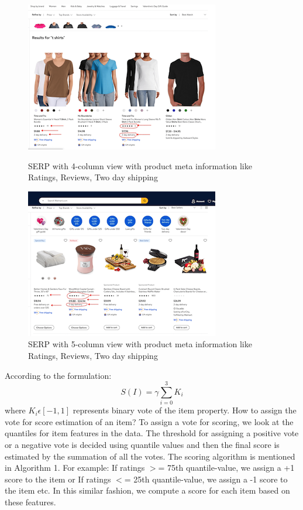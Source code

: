 \documentclass[11pt]{article}
\begin{document}
\begin{figure}[t!]
\vspace{-38mm}
   \centering
   \includegraphics[bb = 0 0 240 185]{figs/4-col-min.png}
   \caption{SERP with 4-column view with product meta information like Ratings, Reviews, Two day shipping}
\vspace{-13mm}
  \includegraphics[bb = 0 0 240 185]{figs/5-col-min.png}
   \caption{SERP with 5-column view with product meta information like Ratings, Reviews, Two day shipping}
   \Description{}
\end{figure}
According to the formulation: 
\begin{equation}
S(I) = \gamma\sum_{i=0}^3 K_i 
\end{equation}
where $K_i \epsilon [-1,1]$ represents binary vote of the item property. 
\newline How to assign the vote for score estimation of an item? To assign a vote for scoring, we look at the quantiles for item features in the data. The threshold for assigning a positive vote or a negative vote is decided using quantile values and then the final score is estimated by the summation of all the votes. The scoring algorithm is mentioned in Algorithm 1.
\newline For example: 
\newline If ratings $>$= 75th quantile-value, we assign a +1 score to the item or
If ratings $<$= 25th quantile-value, we assign a -1 score to the item etc. 
In this similar fashion, we compute a score for each item based on these features. 
\end{document}
